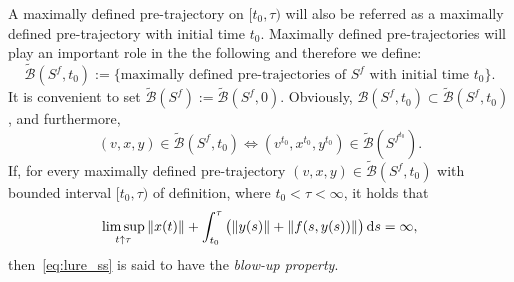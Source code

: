 \documentclass[a4paper,11pt]{article}
\newcommand{\sB}{{\mathcal B}}
\newcommand{\rd}{{\rm d}}
\numberwithin{equation}{section}
\numberwithin{figure}{section}
\numberwithin{table}{section}
\begin{document}
A maximally defined pre-trajectory on $[t_0,\tau)$ will also be referred as a
maximally defined pre-trajectory with initial time $t_0$.
Maximally defined pre-trajectories will play an important role in the the following and
therefore we define:
\[
\tilde\sB(S^f,t_0):=\{\mbox{maximally defined pre-trajectories of $S^f$ with initial time $t_0$}\}.
\]
It is convenient to set $\tilde\sB(S^f):=\tilde\sB(S^f,0)$. Obviously, $\sB(S^f,t_0)\subset\tilde\sB(S^f,t_0)$, and furthermore,
\[
(v,x,y)\in\tilde\sB(S^f,t_0)\Longleftrightarrow (v^{t_0},x^{t_0},y^{t_0})\in\tilde\sB(S^{f^{t_0}}).
\]
If, for every maximally defined pre-trajectory $(v,x,y)\in\tilde\sB(S^f,t_0)$ with bounded interval $[t_0,\tau)$ of definition, where $t_0<\tau<\infty$, it holds that
\[
\limsup_{t\uparrow\tau}\|x(t)\|+\int_{t_0}^\tau\big(\|y(s)\|+\|f(s,y(s))\|\big) \, \rd s=\infty,
\]
then~\eqref{eq:lure_ss} is said to have the {\it blow-up property}.
\end{document}
